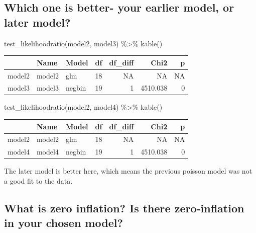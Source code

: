 \documentclass[
  letterpaper,
  DIV=11,
  numbers=noendperiod]{scrartcl}
\newenvironment{Shaded}{\begin{snugshade}}{\end{snugshade}}
\newcommand{\FunctionTok}[1]{\textcolor[rgb]{0.28,0.35,0.67}{#1}}
\newcommand{\NormalTok}[1]{\textcolor[rgb]{0.00,0.23,0.31}{#1}}
\newcommand{\SpecialCharTok}[1]{\textcolor[rgb]{0.37,0.37,0.37}{#1}}
\begin{document}
\subsection{Which one is better- your earlier model, or later
model?}\label{which-one-is-better--your-earlier-model-or-later-model}

\begin{Shaded}
\begin{Highlighting}[]
\FunctionTok{test\_likelihoodratio}\NormalTok{(model2, model3) }\SpecialCharTok{\%\textgreater{}\%}
  \FunctionTok{kable}\NormalTok{()}
\end{Highlighting}
\end{Shaded}

\begin{longtable}[]{@{}lllrrrr@{}}
\toprule\noalign{}
& Name & Model & df & df\_diff & Chi2 & p \\
\midrule\noalign{}
\endhead
\bottomrule\noalign{}
\endlastfoot
model2 & model2 & glm & 18 & NA & NA & NA \\
model3 & model3 & negbin & 19 & 1 & 4510.038 & 0 \\
\end{longtable}

\begin{Shaded}
\begin{Highlighting}[]
\FunctionTok{test\_likelihoodratio}\NormalTok{(model2, model4) }\SpecialCharTok{\%\textgreater{}\%}
  \FunctionTok{kable}\NormalTok{()}
\end{Highlighting}
\end{Shaded}

\begin{longtable}[]{@{}lllrrrr@{}}
\toprule\noalign{}
& Name & Model & df & df\_diff & Chi2 & p \\
\midrule\noalign{}
\endhead
\bottomrule\noalign{}
\endlastfoot
model2 & model2 & glm & 18 & NA & NA & NA \\
model4 & model4 & negbin & 19 & 1 & 4510.038 & 0 \\
\end{longtable}

The later model is better here, which means the previous poisson model
was not a good fit to the data.

\subsection{What is zero inflation? Is there zero-inflation in your
chosen
model?}\label{what-is-zero-inflation-is-there-zero-inflation-in-your-chosen-model}
\end{document}

